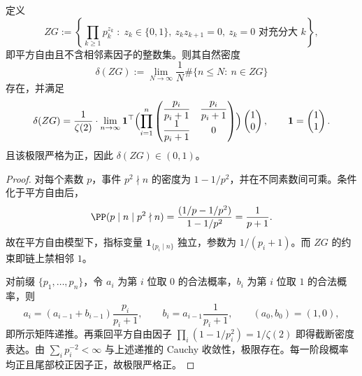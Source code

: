 \begin{theorem}\label{thm:killo-zg-natural-density-transfer-matrix}
定义
\[
ZG:=\left\{
\prod_{k\ge 1}p_k^{z_k}\;:\;
z_k\in\{0,1\},\ z_kz_{k+1}=0,\ z_k=0\text{ 对充分大 }k
\right\},
\]
即平方自由且不含相邻素因子的整数集。则其自然密度
\[
\delta(ZG):=\lim_{N\to\infty}\frac{1}{N}\#\{n\le N:\ n\in ZG\}
\]
存在，并满足
\[
\delta(ZG)
=\frac{1}{\zeta(2)}
\cdot
\lim_{n\to\infty}
\mathbf 1^\top
\Bigl(\prod_{i=1}^{n}
\begin{pmatrix}
\dfrac{p_i}{p_i+1} & \dfrac{p_i}{p_i+1}\\[4pt]
\dfrac{1}{p_i+1} & 0
\end{pmatrix}
\Bigr)
\begin{pmatrix}1\\0\end{pmatrix},
\qquad
\mathbf 1=\begin{pmatrix}1\\1\end{pmatrix}.
\]
且该极限严格为正，因此 \(\delta(ZG)\in(0,1)\)。
\end{theorem}
\begin{proof}
对每个素数 \(p\)，事件 \(p^2\nmid n\) 的密度为 \(1-1/p^2\)，并在不同素数间可乘。条件化于平方自由后，
\[
\PP(p\mid n\mid p^2\nmid n)
=\frac{(1/p-1/p^2)}{1-1/p^2}
=\frac{1}{p+1}.
\]
故在平方自由模型下，指标变量 \(\mathbf 1_{\{p_i\mid n\}}\) 独立，参数为 \(1/(p_i+1)\)。而 \(ZG\) 的约束即链上禁相邻 \(1\)。

对前缀 \(\{p_1,\dots,p_n\}\)，令 \(a_i\) 为第 \(i\) 位取 \(0\) 的合法概率，\(b_i\) 为第 \(i\) 位取 \(1\) 的合法概率，则
\[
a_i=(a_{i-1}+b_{i-1})\frac{p_i}{p_i+1},\qquad
b_i=a_{i-1}\frac{1}{p_i+1},\qquad
(a_0,b_0)=(1,0),
\]
即所示矩阵递推。再乘回平方自由因子 \(\prod_i(1-1/p_i^2)=1/\zeta(2)\) 即得截断密度表达。由 \(\sum_i p_i^{-2}<\infty\) 与上述递推的 Cauchy 收敛性，极限存在。每一阶段概率均正且尾部校正因子正，故极限严格正。
\end{proof}

